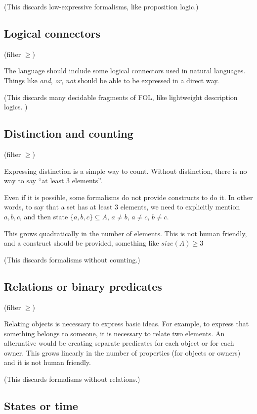 (This discards low-expressive formalisms, like proposition logic.)

\subsection{Logical connectors}

(filter $\geq $)

The language should include some logical connectors used in natural languages.
Things like \textit{and}, \textit{or}, \textit{not} should be able to be expressed in a direct way.

(This discards many decidable fragments of FOL, like lightweight description logics. )

\subsection{Distinction and counting}

(filter $\geq $)

Expressing distinction is a simple way to count.
Without distinction, there is no way to say ``at least 3 elements''.

Even if it is possible, some formalisms do not provide constructs to do it.
In other words, to say that a set has at least 3 elements, we need to explicitly mention $a, b, c$, and then state
$\{a, b, c\} \subseteq A$, $a \neq b$, $a \neq c$, $b \neq c$.

This grows quadratically in the number of elements.
This is not human friendly, and a construct should be provided, something like $size(A) \geq 3$

(This discards formalisms without counting.)

\subsection{Relations or binary predicates}

(filter $\geq $)

Relating objects is necessary to express basic ideas.
For example, to express that something belongs to someone, it is necessary to relate two elements.
An alternative would be creating separate predicates for each object or for each owner.
This grows linearly in the number of properties (for objects or owners) and it is not human friendly.

(This discards formalisms without relations.)

\subsection{States or time}

